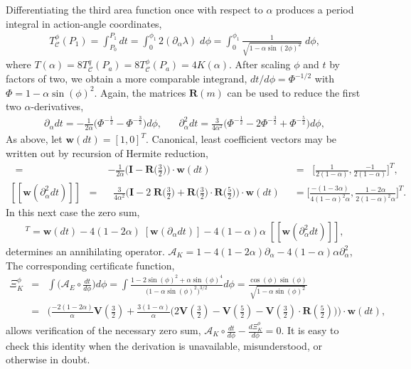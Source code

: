 \documentclass[nofootinbib,preprint]{revtex4-1}
\begin{document}
Differentiating the third area function once with respect to $\alpha$ produces a
period integral in action-angle coordinates,  
\begin{eqnarray}
T^{\phi}_\mathcal{C}(P_1) = \int_{P_0}^{P_1} dt
=  \int_{0}^{\phi_1} 2(\partial_{\alpha} \lambda) \;d\phi
= \int_{0}^{\phi_1} \frac{1}{\sqrt{1-\alpha \sin(2\phi)^2}} \;d\phi,   \nonumber 
\end{eqnarray}
where $T(\alpha)= 8T^{q}_\mathcal{C}(P_a) = 8T^{\phi}_\mathcal{C}(P_a)=4K(\alpha)$. 
After scaling $\phi$ and $t$ by factors of two, we 
obtain a more comparable integrand, $dt/d\phi = \Phi^{-1/2}$ with 
$\Phi=1-\alpha\sin(\phi)^2$. Again, the matrices $\mathbf{R}(m)$
can be used to reduce the first two $\alpha$-derivatives,
\begin{eqnarray}
\partial_{\alpha} dt = -\frac{1}{2\alpha}\bigg(\Phi^{-\frac{1}{2}} - \Phi^{-\frac{3}{2}} \bigg)d\phi,
 \;\;\;\;\;\;
\partial_{\alpha}^2 dt = \frac{3}{4\alpha^2}\bigg(\Phi^{-\frac{1}{2}}
- 2\Phi^{-\frac{3}{2}} + \Phi^{-\frac{5}{2}} \bigg)d\phi,  \nonumber
\end{eqnarray}
As above, let $\mathbf{w}(dt) = [1,0]^T$. Canonical, least 
coefficient vectors may be written out by recursion of Hermite reduction,
\begin{eqnarray}
[\mathbf{w}(\partial_{\alpha}dt)] \;\;
=& -\frac{1}{2\alpha}\Big(\mathbf{I}-\mathbf{R}\big(\tfrac{3}{2}\big)\Big) \cdot \mathbf{w}(dt) 
&= \;\; \bigg[\frac{1}{2(1-\alpha)},\frac{-1}{2(1-\alpha)}\bigg]^T, \nonumber \\
{[[ \mathbf{w}(\partial_{\alpha}^2dt) ]]} \;\;
=& \;\; \frac{3}{4\alpha^2}\Big(\mathbf{I}-2\;\mathbf{R}\big(\tfrac{3}{2}\big)
 + \mathbf{R}\big(\tfrac{3}{2}\big)\cdot  \mathbf{R}\big(\tfrac{5}{2}\big) \Big) \cdot \mathbf{w}(dt) \;\; 
&= \bigg[\frac{-(1-3\alpha)}{4(1-\alpha)^2\alpha},\frac{1-2\alpha}{2(1-\alpha)^2\alpha}\bigg]^T. \nonumber 
\end{eqnarray} 
In this next case the zero sum,
\begin{eqnarray}
[0,0]^T = \mathbf{w}(dt) - 4(1-2\alpha)\;[\mathbf{w}(\partial_{\alpha}dt)]
- 4(1-\alpha)\alpha\;[[\mathbf{w}(\partial_{\alpha}^2dt)]], \nonumber
\end{eqnarray}
determines an annihilating operator. 
$\mathcal{A}_K = 1 - 4(1-2\alpha)\partial_{\alpha} - 4(1-\alpha)\alpha\partial_{\alpha}^2$,
The corresponding certificate function,
\begin{eqnarray}
\Xi^{\phi}_K &=& \int \bigg(\mathcal{A}_E \circ \frac{dt}{d\phi}\bigg) d\phi 
=\int \frac{1-2\sin(\phi)^2+\alpha \sin(\phi)^4}{\big(1-\alpha \sin(\phi)^2\big)^{3/2}} d\phi
=  \frac{\cos(\phi)\sin(\phi)}{\sqrt{1-\alpha \sin(\phi)^2}} \nonumber \\
&=& \Bigg(\frac{-2(1-2\alpha)}{\alpha}\mathbf{V}(\tfrac{3}{2})
+\frac{3(1-\alpha)}{\alpha}\Big(2\mathbf{V}(\tfrac{3}{2})
-\mathbf{V}(\tfrac{5}{2})-\mathbf{V}(\tfrac{3}{2})\cdot
\mathbf{R}(\tfrac{5}{2}) \Big) \Bigg) \cdot \mathbf{w}(dt), \nonumber
\end{eqnarray}
allows verification of the necessary zero sum, 
$\mathcal{A}_K \circ \frac{dt}{d\phi}-\frac{d\Xi^{\phi}_K}{d\phi}=0$.
It is easy to check this identity when the derivation is unavailable, 
misunderstood, or otherwise in doubt.
\end{document}
